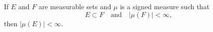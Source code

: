 If $E$ and $F$ are measurable sets and $\mu$ is a signed measure such that
$$E \subset F \quad \text{and} \quad |\mu(F)| < \infty,$$
then $|\mu(E)| < \infty$.
